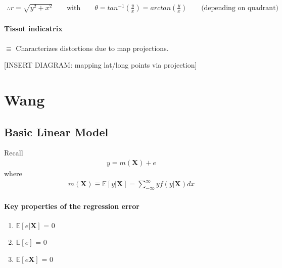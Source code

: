 \begin{eqnarray}
\therefore r = \sqrt{y^{2}+x^{2}} \qquad \text{with} \qquad
    \theta = tan^{-1}(\frac{y}{x}) = arctan(\frac{y}{x}) \qquad \text{(depending on quadrant)}
\end{eqnarray}

\paragraph{Tissot indicatrix} $\equiv$ Characterizes distortions due to map projections.

[INSERT DIAGRAM: mapping lat/long points via projection]


\section{Wang}
\subsection{Basic Linear Model}
Recall
\begin{eqnarray*}
y=m(\boldsymbol{X})+e
\end{eqnarray*}
where
\begin{eqnarray*}
m(\boldsymbol{X}) \equiv \mathbb{E}[y|\boldsymbol{X}]=\sum^{\infty}_{-\infty}yf(y|\boldsymbol{X})dx
\end{eqnarray*}
\paragraph {Key properties of the regression error}
\begin{enumerate}[(1)]
\item $\mathbb{E}[e|\boldsymbol{X}]$ = 0
\item $\mathbb{E}[e]$ = 0
\item $\mathbb{E}[e\boldsymbol{X}]$ = 0
\end{enumerate}


